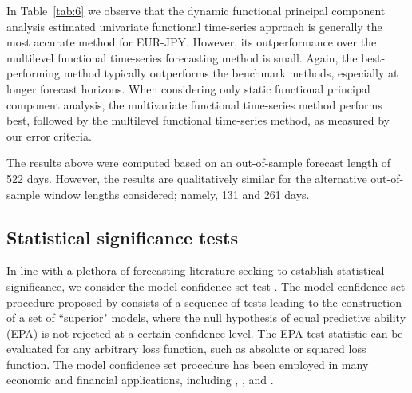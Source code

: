 \documentclass[12pt,a4paper]{article}
\begin{document}
In Table~\ref{tab:6} we observe that the dynamic functional principal component analysis estimated univariate functional time-series approach is generally the most accurate method for EUR-JPY. However, its outperformance over the multilevel functional time-series forecasting method is small. Again, the best-performing method typically outperforms the benchmark methods, especially at longer forecast horizons. When considering only static functional principal component analysis, the multivariate functional time-series method performs best, followed by the multilevel functional time-series method, as measured by our error criteria.

The results above were computed based on an out-of-sample forecast length of 522 days. However, the results are qualitatively similar for the alternative out-of-sample window lengths considered; namely, 131 and 261 days.

\subsection{Statistical significance tests}\label{sec:5.3}

In line with a plethora of forecasting literature seeking to establish statistical significance, we consider the model confidence set test \citep{HLN11}. The model confidence set procedure proposed by \cite{HLN11} consists of a sequence of tests leading to the construction of a set of ``superior" models, where the null hypothesis of equal predictive ability (EPA) is not rejected at a certain confidence level. The EPA test statistic can be evaluated for any arbitrary loss function, such as absolute or squared loss function. The model confidence set procedure has been employed in many economic and financial applications, including \cite{Audrino14}, \cite{CM14}, \cite{BGO16} and \cite{SSRF17}.
\end{document}
